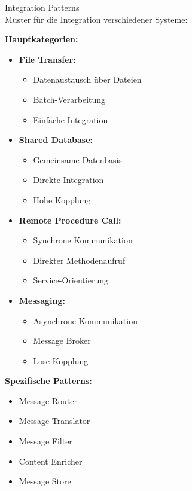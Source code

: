 \begin{concept}{Integration Patterns}\\
Muster für die Integration verschiedener Systeme:

\textbf{Hauptkategorien:}
\begin{itemize}
    \item \textbf{File Transfer:}
    \begin{itemize}
        \item Datenaustausch über Dateien
        \item Batch-Verarbeitung
        \item Einfache Integration
    \end{itemize}
    
    \item \textbf{Shared Database:}
    \begin{itemize}
        \item Gemeinsame Datenbasis
        \item Direkte Integration
        \item Hohe Kopplung
    \end{itemize}
    
    \item \textbf{Remote Procedure Call:}
    \begin{itemize}
        \item Synchrone Kommunikation
        \item Direkter Methodenaufruf
        \item Service-Orientierung
    \end{itemize}
    
    \item \textbf{Messaging:}
    \begin{itemize}
        \item Asynchrone Kommunikation
        \item Message Broker
        \item Lose Kopplung
    \end{itemize}
\end{itemize}

\textbf{Spezifische Patterns:}
\begin{itemize}
    \item Message Router
    \item Message Translator
    \item Message Filter
    \item Content Enricher
    \item Message Store
\end{itemize}
\end{concept}

